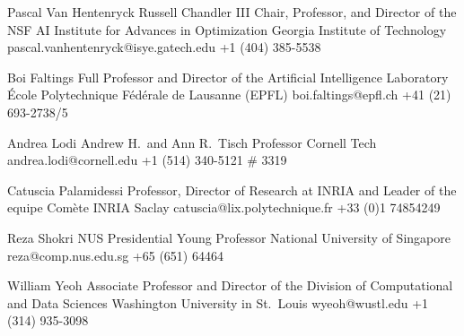 \vspace{12pt}

\begin{multicols}{2}
\begin{referees}
		{Pascal Van Hentenryck}
		{Russell Chandler III Chair, Professor, and Director of the NSF AI Institute for Advances in Optimization}
		{Georgia Institute of Technology}%
		{pascal.vanhentenryck@isye.gatech.edu}
		{+1 (404) 385-5538}

		{Boi Faltings}
		{Full Professor and Director of the Artificial
		Intelligence Laboratory}
		{École Polytechnique Fédérale de Lausanne (EPFL) }%
		{boi.faltings@epfl.ch}
		{+41 (21) 693-2738/5}

		{Andrea Lodi}
		{Andrew H.~and Ann R.~Tisch Professor }
		{Cornell Tech}%
		{andrea.lodi@cornell.edu}
		{+1 (514) 340-5121 \# 3319}

		{Catuscia Palamidessi}
		{Professor, Director of Research at INRIA and Leader of the
		 equipe Comète}
		{INRIA Saclay}%
		{catuscia@lix.polytechnique.fr}
		{+33 (0)1 74854249}

		{Reza Shokri}
		{NUS Presidential Young Professor}
		{National University of Singapore}%
		{reza@comp.nus.edu.sg}
		{+65 (651) 64464}

		{William Yeoh}
		{Associate Professor and Director of the Division of Computational and Data Sciences}
		{Washington University in St.~Louis}%
		{wyeoh@wustl.edu}
		{+1 (314) 935-3098}
\end{referees}
\end{multicols}

